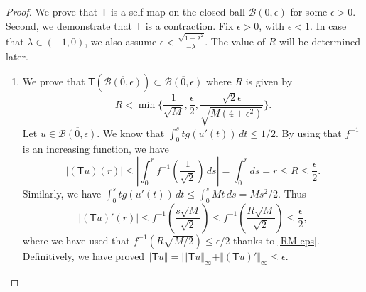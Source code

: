 \documentclass[12pt]{amsart}
\def\t{\mathsf T}
\theoremstyle{definition}
\begin{document}
\begin{proof}
We prove that $\t$ is a self-map on the closed ball $\overline{\mathcal{B}(0,\epsilon )}$ for some $\epsilon >0$. Second, we demonstrate that $\t$ is a contraction. Fix $\epsilon>0$, with $\epsilon<1$. In case that $\lambda\in (-1,0)$, we also assume $\epsilon < \frac{\sqrt{1-\lambda^2}}{-\lambda}$. The value of $R$ will be determined later.

\begin{enumerate}

\item We prove that $\t(\overline{\mathcal{B}(0,\epsilon )}) \subset \overline{\mathcal{B}(0,\epsilon )}$ where $R$ is given by  
\begin{equation}
R<\min  \{ \frac{1}{ \sqrt{M}},\frac{\epsilon}{2},\frac{\sqrt{2}\epsilon}{\sqrt{M(4+\epsilon^2)}}\}.  \label{RM-eps}
\end{equation}
Let $u\in  \overline{\mathcal{B}(0,\epsilon )}$. We know that $\int_0^s tg(u'(t))\, dt\leq 1/2$. By using that $f^{-1}$ is an increasing function,  we have
$$
|(\t u)(r)|\leq  \left| \int_0^r f^{-1} \left ( \frac{1}{\sqrt{2}}\right)\,ds \right|=\int_0^r ds=r \leq R\leq\frac{\epsilon}{2}.
$$
Similarly, we have $\int_0^s tg(u'(t))\, dt\leq \int_0^s Mt\, ds=Ms^2/2$. Thus 
\begin{equation*}
|(\t u)'(r)|\leq f^{-1}\left(\frac{s\sqrt{M}}{\sqrt{2}}\right)\leq f^{-1}\left(\frac{R\sqrt{M}}{\sqrt{2}}\right)\leq\frac{\epsilon}{2},
\end{equation*}
where we have used that $f^{-1}(R\sqrt{M/2})\leq\epsilon/2$ thanks to \eqref{RM-eps}.
Definitively, we have proved $\Vert \t u\Vert =|\Vert \t u\Vert_\infty+\Vert(\t u)'\Vert_\infty\leq\epsilon$.
 

\end{enumerate}
\end{proof}
\end{document}
